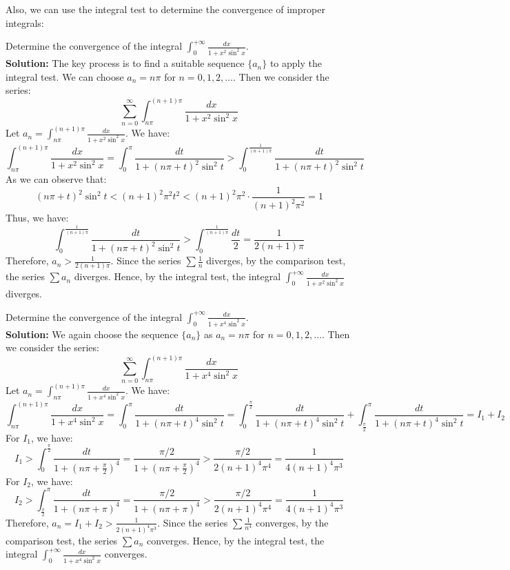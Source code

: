 \documentclass[oneside]{book}
\begin{document}
Also, we can use the integral test to determine the convergence of improper integrals:

\begin{example}
    Determine the convergence of the integral $\int_{0}^{+\infty} \frac{dx}{1 + x^2 \sin^2 x}$. \\
    \textbf{Solution:} The key process is to find a suitable sequence $\{a_n\}$ to apply the integral test. We can choose $a_n = n\pi$ for $n = 0, 1, 2, \ldots$. Then we consider the series:
    \[\sum_{n=0}^{\infty} \int_{n\pi}^{(n+1)\pi} \frac{dx}{1 + x^2 \sin^2 x}\]
    Let $a_n = \int_{n\pi}^{(n+1)\pi} \frac{dx}{1 + x^2 \sin^2 x}$. We have:
    \[
    \int_{n\pi}^{(n+1)\pi} \frac{dx}{1 + x^2 \sin^2 x} = \int_{0}^{\pi} \frac{dt}{1 + (n\pi + t)^2 \sin^2 t} > \int_{0}^{\frac{1}{(n+1)\pi}} \frac{dt}{1 + (n\pi + t)^2 \sin^2 t}
    \]
    As we can observe that:
    \[
    (n\pi + t)^2 \sin^2 t < (n+1)^2 \pi^2 t^2 < (n+1)^2 \pi^2 \cdot \frac{1}{(n+1)^2 \pi^2} = 1
    \]
    Thus, we have:
    \[\int_{0}^{\frac{1}{(n+1)\pi}} \frac{dt}{1 + (n\pi + t)^2 \sin^2 t} > \int_{0}^{\frac{1}{(n+1)\pi}} \frac{dt}{2} = \frac{1}{2(n+1)\pi}\]
    Therefore, $a_n > \frac{1}{2(n+1)\pi}$. Since the series $\sum \frac{1}{n}$ diverges, by the comparison test, the series $\sum a_n$ diverges. Hence, by the integral test, the integral $\int_{0}^{+\infty} \frac{dx}{1 + x^2 \sin^2 x}$ diverges.
\end{example}

\newpage

\begin{example}
    Determine the convergence of the integral $\int_{0}^{+\infty} \frac{dx}{1 + x^4 \sin^2 x}$. \\
    \textbf{Solution:} We again choose the sequence $\{a_n\}$ as $a_n = n\pi$ for $n = 0, 1, 2, \ldots$. Then we consider the series:
    \[\sum_{n=0}^{\infty} \int_{n\pi}^{(n+1)\pi} \frac{dx}{1 + x^4 \sin^2 x}\]
    Let $a_n = \int_{n\pi}^{(n+1)\pi} \frac{dx}{1 + x^4 \sin^2 x}$. We have:
    \[
    \int_{n\pi}^{(n+1)\pi} \frac{dx}{1 + x^4 \sin^2 x} = \int_{0}^{\pi} \frac{dt}{1 + (n\pi + t)^4 \sin^2 t}
    = \int_{0}^{\frac{\pi}{2}} \frac{dt}{1 + (n\pi + t)^4 \sin^2 t} + \int_{\frac{\pi}{2}}^{\pi} \frac{dt}{1 + (n\pi + t)^4 \sin^2 t} = I_1 + I_2
    \]
    For $I_1$, we have:
    \[I_1 > \int_{0}^{\frac{\pi}{2}} \frac{dt}{1 + (n\pi + \frac{\pi}{2})^4} = \frac{\pi/2}{1 + (n\pi + \frac{\pi}{2})^4} > \frac{\pi/2}{2(n+1)^4 \pi^4} = \frac{1}{4(n+1)^4 \pi^3}\]
    For $I_2$, we have:
    \[I_2 > \int_{\frac{\pi}{2}}^{\pi} \frac{dt}{1 + (n\pi + \pi)^4} = \frac{\pi/2}{1 + (n\pi + \pi)^4} > \frac{\pi/2}{2(n+1)^4 \pi^4} = \frac{1}{4(n+1)^4 \pi^3}\]
    Therefore, $a_n = I_1 + I_2 > \frac{1}{2(n+1)^4 \pi^3}$. Since the series $\sum \frac{1}{n^4}$ converges, by the comparison test, the series $\sum a_n$ converges. Hence, by the integral test, the integral $\int_{0}^{+\infty} \frac{dx}{1 + x^4 \sin^2 x}$ converges.
\end{example}
\end{document}
